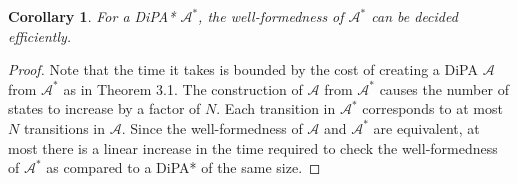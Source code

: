 \documentclass[12pt]{article}
\newtheorem{cor}[thm]{Corollary}
\theoremstyle{definition}
\begin{document}
\begin{cor}
	For a DiPA* $\mathcal{A}^*$, the well-formedness of $\mathcal{A}^*$ can be decided efficiently.
\end{cor}
\begin{proof}
	Note that the time it takes is bounded by the cost of creating a DiPA $\mathcal{A}$ from $\mathcal{A}^*$ as in Theorem 3.1. The construction of $\mathcal{A}$ from $\mathcal{A}^*$ causes the number of states to increase by a factor of $N$. 
	Each transition in $\mathcal{A}^*$ corresponds to at most $N$ transitions in $\mathcal{A}$. Since the well-formedness of $\mathcal{A}$ and $\mathcal{A}^*$ are equivalent, at most there is a linear increase in the time required to check the well-formedness of $\mathcal{A}^*$ as compared to a DiPA* of the same size.
\end{proof}


\end{document}
